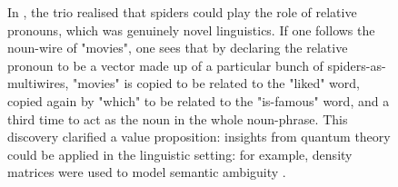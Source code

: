 \begin{figure}[h!]
\centering
{}
\caption{In \citep{sadrzadehFrobeniusAnatomyWord2013a,sadrzadehFrobeniusAnatomyWord2016a}, the trio realised that spiders could play the role of relative pronouns, which was genuinely novel linguistics. If one follows the noun-wire of "movies", one sees that by declaring the relative pronoun to be a vector made up of a particular bunch of spiders-as-multiwires, "movies" is copied to be related to the "liked" word, copied again by "which" to be related to the "is-famous" word, and a third time to act as the noun in the whole noun-phrase. This discovery clarified a value proposition: insights from quantum theory could be applied in the linguistic setting: for example, density matrices were used to model semantic ambiguity \citep{meyerModellingLexicalAmbiguity2020}.}
\end{figure}

